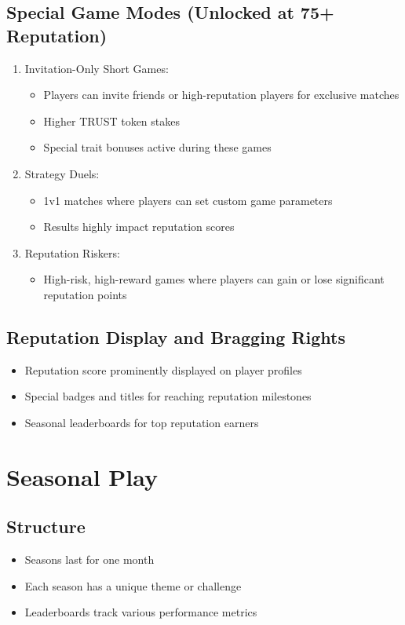\documentclass[12pt,a4paper]{article}
\begin{document}
\subsection{Special Game Modes (Unlocked at 75+ Reputation)}
\begin{enumerate}
    \item Invitation-Only Short Games:
    \begin{itemize}
        \item Players can invite friends or high-reputation players for exclusive matches
        \item Higher TRUST token stakes
        \item Special trait bonuses active during these games
    \end{itemize}
    \item Strategy Duels:
    \begin{itemize}
        \item 1v1 matches where players can set custom game parameters
        \item Results highly impact reputation scores
    \end{itemize}
    \item Reputation Riskers:
    \begin{itemize}
        \item High-risk, high-reward games where players can gain or lose significant reputation points
    \end{itemize}
\end{enumerate}

\subsection{Reputation Display and Bragging Rights}
\begin{itemize}
    \item Reputation score prominently displayed on player profiles
    \item Special badges and titles for reaching reputation milestones
    \item Seasonal leaderboards for top reputation earners
\end{itemize}

\section{Seasonal Play}

\subsection{Structure}
\begin{itemize}
    \item Seasons last for one month
    \item Each season has a unique theme or challenge
    \item Leaderboards track various performance metrics
\end{itemize}
\end{document}
